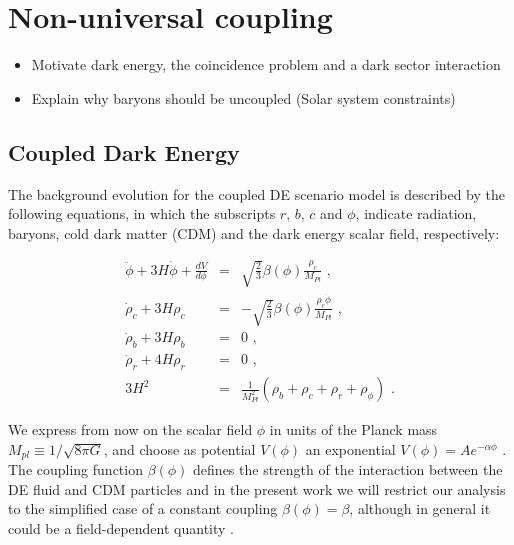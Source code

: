 \section{Non-universal coupling \label{sec:nonuniversal-coupling}}

\begin{itemize}
\item Motivate dark energy, the coincidence problem and a dark sector interaction
\item Explain why baryons should be uncoupled (Solar system constraints)
\end{itemize}

\subsection{Coupled Dark Energy \label{sub:CDE}}

The background evolution for the coupled DE scenario model is described
by the following equations, in which the subscripts $r$, $b$, $c$
and $\phi$, indicate radiation, baryons, cold dark matter (CDM) and
the dark energy scalar field, respectively:

\begin{eqnarray}
\ddot{\phi}+3H\dot{\phi}+\frac{dV}{d\phi} & = & \sqrt{\frac{2}{3}}\beta(\phi)\frac{\rho_{c}}{M_{Pl}}\,\,,\label{eq:quint-kleingordon}\\
\dot{\rho}_{c}+3H\rho_{c} & = & -\sqrt{\frac{2}{3}}\beta(\phi)\frac{\rho_{c}\dot{\phi}}{M_{Pl}}\,\,,\label{eq:cdm-back-density}\\
\dot{\rho}_{b}+3H\rho_{b} & = & 0\,\,,\\
\dot{\rho}_{r}+4H\rho_{r} & = & 0\,\,,\\
3H^{2} & = & \frac{1}{M_{Pl}^{2}}(\rho_{b}+\rho_{c}+\rho_{r}+\rho_{\phi})\,\,.
\end{eqnarray}


We express from now on the scalar field $\phi$ in units of the Planck
mass $M_{pl}\equiv1/\sqrt{8\pi G}$, and choose as potential $V(\phi)$
an exponential $V(\phi)=Ae^{-\alpha\phi}$ \citep{Lucchin_Matarrese_1984,Wetterich_1988}.
The coupling function $\beta(\phi)$ defines the strength of the interaction
between the DE fluid and CDM particles and in the present work we
will restrict our analysis to the simplified case of a constant coupling
$\beta(\phi)=\beta$, although in general it could be a field-dependent
quantity \cite{Amendola_2004,Baldi_2011a}.

